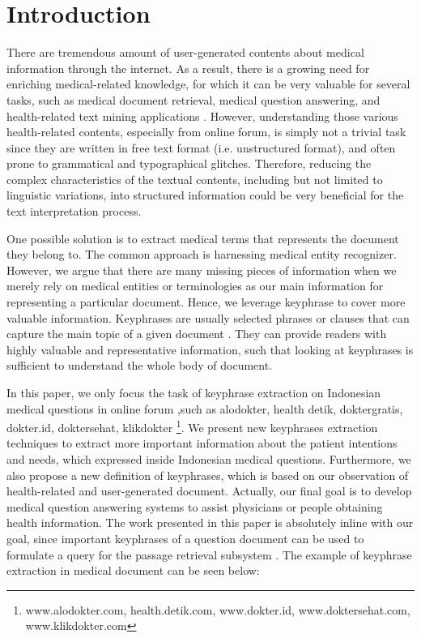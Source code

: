 \section{Introduction}

There are tremendous amount of user-generated contents about medical information through the internet. As a result, there is a growing need for enriching medical-related knowledge, for which it can be very valuable for several tasks, such as medical document retrieval, medical question answering, and health-related text mining applications \cite{cao2010automatically}. However, understanding those various health-related contents, especially from online forum, is simply not a trivial task since they are written in free text format (i.e. unstructured format), and often prone to grammatical and typographical glitches. Therefore, reducing the complex characteristics of the textual contents, including but not limited to linguistic variations, into structured information could be very beneficial for the text interpretation process. 

One possible solution is to extract medical terms that represents the document they belong to. The common approach is harnessing medical entity recognizer. However, we argue that there are many missing pieces of information when we merely rely on medical entities or terminologies as our main information for representing a particular document. Hence, we leverage keyphrase to cover more valuable information. Keyphrases are usually selected phrases or clauses that can capture the main topic of a given document \cite{turney2000learning}. They can provide readers with highly valuable and representative information, such that looking at keyphrases is sufficient to understand the whole body of document.

In this paper, we only focus the task of keyphrase extraction on Indonesian medical questions in online forum ,such as alodokter, health detik, doktergratis, dokter.id, doktersehat, klikdokter \footnote{www.alodokter.com, health.detik.com, www.dokter.id, www.doktersehat.com, www.klikdokter.com}. We present new keyphrases extraction techniques to extract more important information about the patient intentions and needs, which expressed inside Indonesian medical questions. Furthermore, we also propose a new definition of keyphrases, which is based on our observation of health-related and user-generated document. Actually, our final goal is to develop medical question answering systems to assist physicians or people obtaining health information. The work presented in this paper is absolutely inline with our goal, since important keyphrases of a question document can be used to formulate a query for the passage retrieval subsystem \cite{gong2009improving}. The example of keyphrase extraction in medical document can be seen below:

